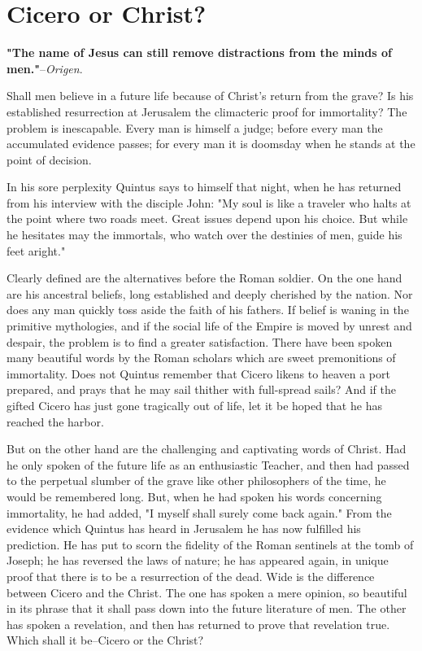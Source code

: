 \chapter*{Cicero or Christ?}
\textbf{"The name of Jesus can still remove distractions from the minds of
men."}--\textit{Origen}.


Shall men believe in a future life because of Christ's return from
the grave?  Is his established resurrection at Jerusalem the
climacteric proof for immortality?  The problem is inescapable.
Every man is himself a judge; before every man the accumulated
evidence passes; for every man it is doomsday when he stands at the
point of decision.

In his sore perplexity Quintus says to himself that night, when he
has returned from his interview with the disciple John: "My soul is
like a traveler who halts at the point where two roads meet.  Great
issues depend upon his choice.  But while he hesitates may the
immortals, who watch over the destinies of men, guide his feet
aright."

Clearly defined are the alternatives before the Roman soldier.  On
the one hand are his ancestral beliefs, long established and deeply
cherished by the nation.  Nor does any man quickly toss aside the
faith of his fathers.  If belief is waning in the primitive
mythologies, and if the social life of the Empire is moved by
unrest and despair, the problem is to find a greater satisfaction.
There have been spoken many beautiful words by the Roman scholars
which are sweet premonitions of immortality.  Does not Quintus
remember that Cicero likens to heaven a port prepared, and prays
that he may sail thither with full-spread sails?  And if the gifted
Cicero has just gone tragically out of life, let it be hoped that
he has reached the harbor.

But on the other hand are the challenging and captivating words of
Christ.  Had he only spoken of the future life as an enthusiastic
Teacher, and then had passed to the perpetual slumber of the grave
like other philosophers of the time, he would be remembered long.
But, when he had spoken his words concerning immortality, he had
added, "I myself shall surely come back again."  From the evidence
which Quintus has heard in Jerusalem he has now fulfilled his
prediction.  He has put to scorn the fidelity of the Roman
sentinels at the tomb of Joseph; he has reversed the laws of
nature; he has appeared again, in unique proof that there is to be
a resurrection of the dead.  Wide is the difference between Cicero
and the Christ.  The one has spoken a mere opinion, so beautiful in
its phrase that it shall pass down into the future literature of
men.  The other has spoken a revelation, and then has returned to
prove that revelation true.  Which shall it be--Cicero or the
Christ?

